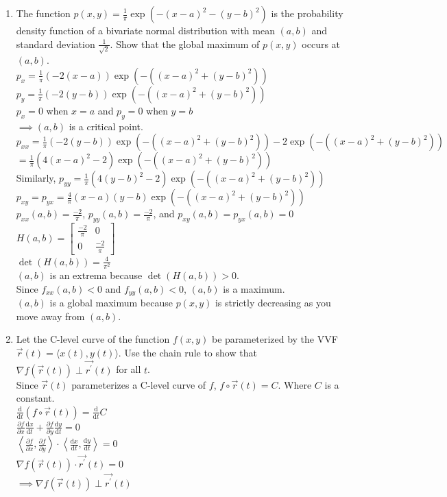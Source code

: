 \begin{enumerate}
	\item The function $p(x,y)=\frac{1}{\pi}\exp{\left(-(x-a)^2-(y-b)^2\right)}$ is the probability density function of a bivariate normal distribution with mean $(a,b)$ and standard deviation $\frac{1}{\sqrt{2}}$. Show that the global maximum of $p(x,y)$ occurs at $(a,b)$.\\
	\indent
	$p_x=\frac{1}{\pi}(-2(x-a))\exp{(-((x-a)^2+(y-b)^2))}$\\
	$p_y=\frac{1}{\pi}(-2(y-b))\exp{(-((x-a)^2+(y-b)^2))}$\\
	$p_x=0$ when $x=a$ and $p_y=0$ when $y=b$\\
	$\implies (a,b)$ is a critical point.\\
	$p_{xx}=\frac{1}{\pi}(-2(y-b))\exp{(-((x-a)^2+(y-b)^2))}-2\exp{(-((x-a)^2+(y-b)^2))}$\\
	$=\frac{1}{\pi}(4(x-a)^2-2)\exp{(-((x-a)^2+(y-b)^2))}$\\
	Similarly, $p_{yy}=\frac{1}{\pi}(4(y-b)^2-2)\exp{(-((x-a)^2+(y-b)^2))}$\\
	$p_{xy}=p_{yx}=\frac{4}{\pi}(x-a)(y-b)\exp{(-((x-a)^2+(y-b)^2))}$\\
	$p_{xx}(a,b)=\frac{-2}{\pi}$, $p_{yy}(a,b)=\frac{-2}{\pi}$, and $p_{xy}(a,b)=p_{yx}(a,b)=0$\\
	$H(a,b)=\begin{bmatrix}
		\frac{-2}{\pi} & 0 \\
		0 & \frac{-2}{\pi}
	\end{bmatrix}$\\
	$\det{(H(a,b))}=\frac{4}{\pi^2}$\\
	$(a,b)$ is an extrema because $\det{(H(a,b))}>0$.\\
	Since $f_{xx}(a,b)<0$ and $f_{yy}(a,b)<0$, $(a,b)$ is a maximum.\\
	$(a,b)$ is a global maximum because $p(x,y)$ is strictly decreasing as you move away from $(a,b)$.\\
	
	\item Let the C-level curve of the function $f(x,y)$ be parameterized by the VVF $\vec{r}(t)=\langle x(t), y(t)\rangle$. Use the chain rule to show that $\nabla f(\vec{r}(t))\perp\vec{r^\prime}(t)$ for all $t$.\\
	\indent
	Since $\vec{r}(t)$ parameterizes a C-level curve of $f$, $f\circ\vec{r}(t)=C$. Where $C$ is a constant.\\
	$\frac{\mathrm{d}}{\mathrm{d}t}(f\circ\vec{r}(t))=\frac{\mathrm{d}}{\mathrm{d}t}C$\\
	$\frac{\partial f}{\partial x}\frac{\mathrm{d}x}{\mathrm{d}t}+\frac{\partial f}{\partial y}\frac{\mathrm{d}y}{\mathrm{d}t}=0$\\
	$\left<\frac{\partial f}{\partial x},\frac{\partial f}{\partial y}\right>\cdot\left<\frac{\mathrm{d}x}{\mathrm{d}t},\frac{\mathrm{d}y}{\mathrm{d}t}\right>=0$\\
	$\nabla f(\vec{r}(t))\cdot\vec{r^\prime}(t)=0$\\
	$\implies \nabla f(\vec{r}(t))\perp\vec{r^\prime}(t)$\\
\end{enumerate}